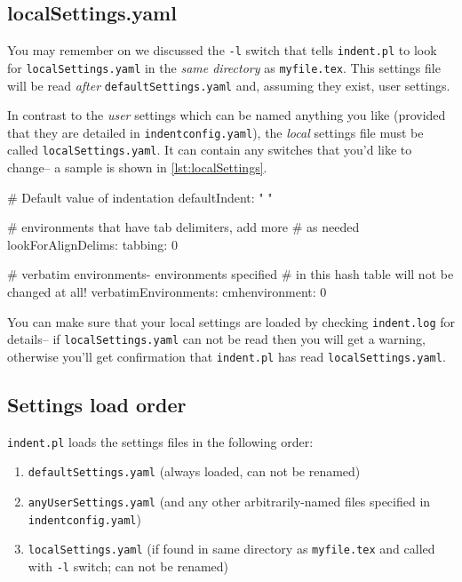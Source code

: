 \subsection{localSettings.yaml}
You may remember on  we discussed the \lstinline!-l! switch
that tells \lstinline!indent.pl! to look for \lstinline!localSettings.yaml! in the 
\emph{same directory} as \lstinline!myfile.tex!. This settings file will 
be read \emph{after} \lstinline!defaultSettings.yaml! and, assuming they exist, 
user settings. 
 	 	 	 	 	
In contrast to the \emph{user} settings which can be named anything you like (provided that
they are detailed in \lstinline!indentconfig.yaml!), the \emph{local} settings file
must be called \lstinline!localSettings.yaml!. It can contain any switches that you'd
like to change-- a sample is shown in \cref{lst:localSettings}.
 	 	 	 	 	
\begin{yaml}[caption={\lstinline!localSettings.yaml! (example)},label={lst:localSettings}]
# Default value of indentation
defaultIndent: " "

# environments that have tab delimiters, add more 
# as needed
lookForAlignDelims:
   tabbing: 0

#  verbatim environments- environments specified 
#  in this hash table will not be changed at all!
verbatimEnvironments:
    cmhenvironment: 0
\end{yaml}
 	 	 	 	 	
You can make sure that your local settings are loaded by checking \lstinline!indent.log!
for details-- if \lstinline!localSettings.yaml! can not be read then you will
get a warning, otherwise you'll get confirmation that 
\lstinline!indent.pl! has read \lstinline!localSettings.yaml!.
 	 	 	 	 	
\subsection{Settings load order}
\lstinline!indent.pl! loads the settings files in the following order:
\begin{enumerate}
	\item \lstinline!defaultSettings.yaml! (always loaded, can not be renamed)
	\item \lstinline!anyUserSettings.yaml! (and any other arbitrarily-named files specified in \lstinline!indentconfig.yaml!)
	\item \lstinline!localSettings.yaml! (if found in same directory as \lstinline!myfile.tex! and called
		with \lstinline!-l! switch; can not be renamed)
\end{enumerate}
 	 	 	 	 	
